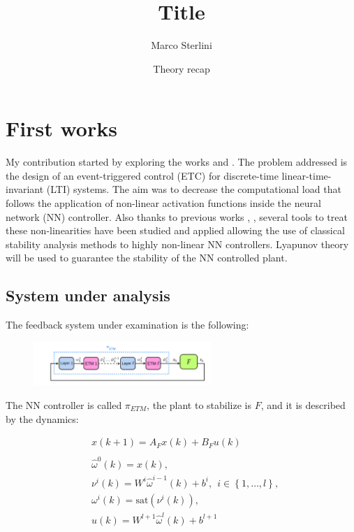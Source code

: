 \documentclass{article}
\begin{document}
\date{Theory recap}
\author{Marco Sterlini}

\title{Title}
\maketitle

\section*{First works}
My contribution started by exploring the works \cite{css-paper} and \cite{css-extended}. The problem addressed is the design of an event-triggered control (ETC) for discrete-time linear-time-invariant (LTI) systems.
The aim was to decrease the computational load that follows the application of non-linear activation functions inside the neural network (NN) controller. Also thanks to previous works \cite{sophie-book-saturation}, \cite{arcak-first}, \cite{iqc-intro} several tools to treat these non-linearities have been studied and applied allowing the use of classical stability analysis methods to highly non-linear NN controllers. Lyapunov theory will be used to guarantee the stability of the NN controlled plant.

\subsection*{System under analysis}

The feedback system under examination is the following:

\begin{figure}[H]
    \centering
    \includegraphics[width=0.6\textwidth]{img/simple-etm}
    \label{}
\end{figure}

The NN controller is called $\pi_{ETM}$, the plant to stabilize is $F$, and it is described by the dynamics:

\begin{align*}
    &x(k + 1) = A_{F} x(k) + B_{F} u(k)\\
    \\
    &\hat{\omega}^{0}(k) = x(k),\\
    &\nu^{i}(k) = W^{i} \hat{\omega}^{i-1}(k) + b^{i},\ \ i \in \left\{ 1, \dots, l \right\},\\
    &\omega^{i}(k) = \text{sat}(\nu^{i}(k)),\\
    &u(k) = W^{l+1} \hat{\omega}^{l} (k) + b^{l+1}\\ 
\end{align*}
\end{document}
